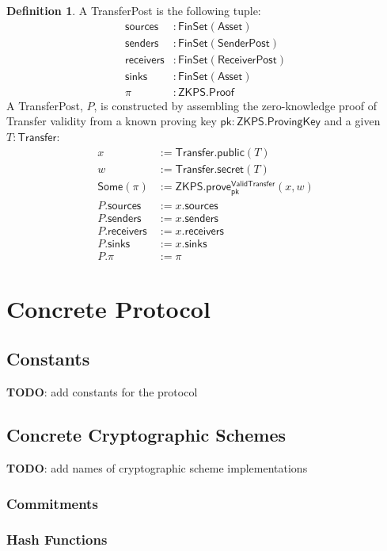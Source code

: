 \documentclass[a4paper]{article}
\newcommand{\lsection}[2]{\def\sectionlabel{#2} \section{#1}\label{sec:#2}}
\newcommand{\TODO}[1]{{\color{red}\textbf{TODO}}: #1}
\theoremstyle{definition}
\newtheorem{definition}{Definition}[subsection]
\newcommand{\Asset}{{\textsf{Asset}}}
\newcommand{\FinSet}{{\textsf{FinSet}}}
\newcommand{\Proof}{{\textsf{Proof}}}
\newcommand{\ProvingKey}{{\textsf{ProvingKey}}}
\newcommand{\ReceiverPost}{{\textsf{ReceiverPost}}}
\newcommand{\SenderPost}{{\textsf{SenderPost}}}
\newcommand{\Some}{{\textsf{Some}}}
\newcommand{\TransferPost}{{\textsf{TransferPost}}}
\newcommand{\Transfer}{{\textsf{Transfer}}}
\newcommand{\ValidTransfer}{{\textsf{ValidTransfer}}}
\newcommand{\ZKPS}{{\textsf{ZKPS}}}
\newcommand{\pk}{{\textsf{pk}}}
\newcommand{\prove}{{\textsf{prove}}}
\newcommand{\public}{{\textsf{public}}}
\newcommand{\receivers}{{\textsf{receivers}}}
\newcommand{\secret}{{\textsf{secret}}}
\newcommand{\senders}{{\textsf{senders}}}
\newcommand{\sinks}{{\textsf{sinks}}}
\newcommand{\sources}{{\textsf{sources}}}
\begin{document}
\begin{definition}
    A \TransferPost{} is the following tuple:
    \begin{align*}
        \sources   &: \FinSet(\Asset) \\
        \senders   &: \FinSet(\SenderPost) \\
        \receivers &: \FinSet(\ReceiverPost) \\
        \sinks     &: \FinSet(\Asset) \\
        \pi        &: \ZKPS.\Proof
    \end{align*}
    A \TransferPost{}, $P$, is constructed by assembling the zero-knowledge proof of \Transfer{} validity from a known proving key $\pk : \ZKPS.\ProvingKey$ and a given $T : \Transfer$:
    \begin{align*}
        x            &:= \Transfer.\public(T) \\
        w            &:= \Transfer.\secret(T) \\
        \Some(\pi)   &:= \ZKPS.\prove^\ValidTransfer_\pk(x, w) \\
        P.\sources   &:= x.\sources \\
        P.\senders   &:= x.\senders \\
        P.\receivers &:= x.\receivers \\
        P.\sinks     &:= x.\sinks \\
        P.\pi        &:= \pi
    \end{align*}
\end{definition}

\lsection{Concrete Protocol}{concrete-protocol}

\subsection{Constants}

\TODO{add constants for the protocol}

\subsection{Concrete Cryptographic Schemes}

\TODO{add names of cryptographic scheme implementations}

\subsubsection{Commitments}

\subsubsection{Hash Functions}
\end{document}
